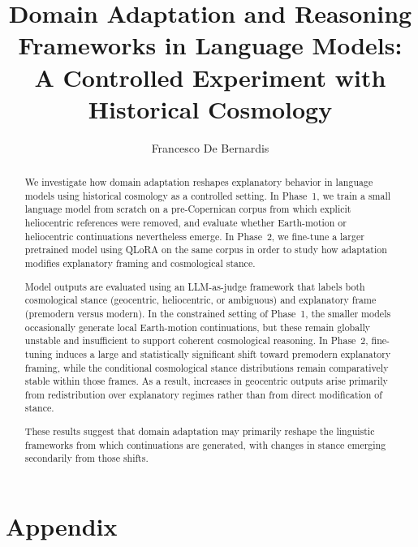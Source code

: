 \documentclass{article}
\title{Domain Adaptation and Reasoning Frameworks in Language Models: A Controlled Experiment with Historical Cosmology}
\author{Francesco De Bernardis}
\begin{document}



\maketitle

\begin{abstract}
We investigate how domain adaptation reshapes explanatory behavior in language models using historical cosmology as a controlled setting. In Phase~1, we train a small language model from scratch on a pre-Copernican corpus from which explicit heliocentric references were removed, and evaluate whether Earth-motion or heliocentric continuations nevertheless emerge. In Phase~2, we fine-tune a larger pretrained model using QLoRA on the same corpus in order to study how adaptation modifies explanatory framing and cosmological stance.

Model outputs are evaluated using an LLM-as-judge framework that labels both cosmological stance (geocentric, heliocentric, or ambiguous) and explanatory frame (premodern versus modern). In the constrained setting of Phase~1, the smaller models occasionally generate local Earth-motion continuations, but these remain globally unstable and insufficient to support coherent cosmological reasoning. In Phase~2, fine-tuning induces a large and statistically significant shift toward premodern explanatory framing, while the conditional cosmological stance distributions remain comparatively stable within those frames. As a result, increases in geocentric outputs arise primarily from redistribution over explanatory regimes rather than from direct modification of stance.

These results suggest that domain adaptation may primarily reshape the linguistic frameworks from which continuations are generated, with changes in stance emerging secondarily from those shifts.

\end{abstract}
\vspace{1em}






% 




\newpage
\appendix
\section*{Appendix}



\newpage
% 


\end{document}
